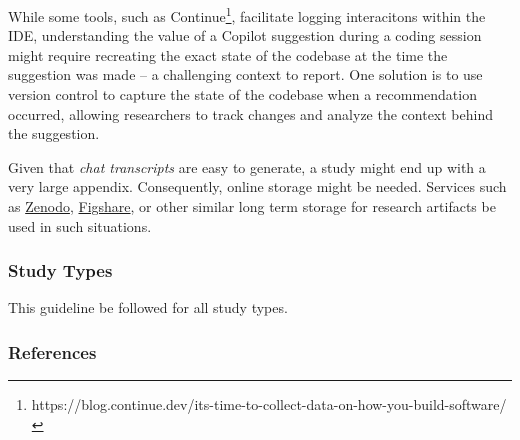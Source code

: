 While some tools, such as Continue\footnote{https://blog.continue.dev/its-time-to-collect-data-on-how-you-build-software/}, facilitate logging interacitons within the IDE, understanding the value of a Copilot suggestion during a coding session might require recreating the exact state of the codebase at the time the suggestion was made -- a challenging context to report. One solution is to use version control to capture the state of the codebase when a recommendation occurred, allowing researchers to track changes and analyze the context behind the suggestion.



Given that {\em chat transcripts} are easy to generate, a study might end up with a very large appendix. Consequently, online storage might be needed. Services such as \href{https://zenodo.org}{Zenodo}, \href{https://figshare.com/}{Figshare}, or other similar long term storage for research artifacts \should be used in such situations.




\subsubsection{Study Types}

This guideline \should be followed for all study types. 

\subsubsection{References}





